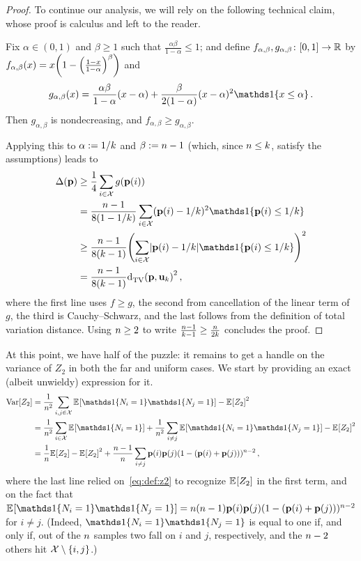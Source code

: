 \begin{proof}
To continue our analysis, we will rely on the following technical claim, whose proof is calculus and left to the reader.
\begin{claim}
Fix $\alpha\in(0,1)$ and $\beta \geq 1$ such that $\frac{\alpha\beta}{1-\alpha} \leq 1$; and define $f_{\alpha,\beta},g_{\alpha,\beta}\colon [0,1]\to\mathbb{R}$ by
$
f_{\alpha,\beta}(x) = x\Paren{1-\Paren{\frac{1-x}{1-\alpha}}^\beta}$ and 
\[
g_{\alpha,\beta}(x) = \frac{\alpha\beta}{1-\alpha}(x-\alpha) + \frac{\beta}{2(1-\alpha)} (x-\alpha)^2 \indic{x\leq \alpha}\,.
\]
Then $g_{\alpha,\beta}$ is nondecreasing, and $f_{\alpha,\beta}\geq g_{\alpha,\beta}$.
\end{claim}
Applying this to $\alpha:= 1/k$ and $\beta := n-1$ (which, since $n\leq k$, satisfy the assumptions) leads to
\begin{align*}
  \Delta(\p) 
  &%
  \geq \frac{1}{4}\sum_{i\in\domain} g(\p(i)) \\
  &= \frac{\ns-1}{8(1-1/\ab)} \sum_{i\in\domain} (\p(i)-1/\ab)^2\indic{\p(i)\leq 1/\ab} \\
  &\geq \frac{\ns-1}{8(\ab-1)} \Paren{\sum_{i\in\domain} \abs{\p(i)-1/\ab}\indic{\p(i)\leq 1/\ab}}^2 \\
  &= \frac{\ns-1}{8(\ab-1)} \totalvardist{\p}{\uniform_\ab}^2\,,
\end{align*}
where the first line uses $f\geq g$, the second from cancellation of the linear term of $g$, the third is Cauchy--Schwarz, and the last follows from the definition of total variation distance. Using $n \geq 2$ to write $\frac{n-1}{k-1}\geq \frac{n}{2k}$ concludes the proof.
\end{proof}
At this point, we have half of the puzzle: it remains to get a handle on the variance of $Z_2$ in both the far and uniform cases. We start by providing an exact (albeit unwieldy) expression for it.%
\begin{align*}
\Var[Z_2] 
&= \frac{1}{\ns^2}\sum_{i,j\in\domain} \bEE{\indic{\occur_i=1}\indic{\occur_j=1}} - \bEE{Z_2}^2  \\
&= \frac{1}{\ns^2}\sum_{i\in\domain} \bEE{\indic{\occur_i=1}} + \frac{1}{\ns^2}\sum_{i\neq j} \bEE{\indic{\occur_i=1}\indic{\occur_j=1}} - \bEE{Z_2}^2 \\
&= \frac{1}{\ns}\bEE{Z_2}- \bEE{Z_2}^2 + \frac{\ns-1}{\ns}\sum_{i\neq j} \p(i)\p(j)(1-(\p(i)+\p(j)))^{\ns-2}\,, %
\end{align*}
where the last line relied on~\cref{eq:def:z2} to recognize $\bEE{Z_2}$ in the first term, and on the fact that $\bEE{\indic{\occur_i=1}\indic{\occur_j=1}} = \ns(\ns-1)\p(i)\p(j)(1-(\p(i)+\p(j)))^{\ns-2}$ for $i\neq j$. (Indeed, $\indic{\occur_i=1}\indic{\occur_j=1}$ is equal to one if, and only if, out of the $n$ samples two fall on $i$ and $j$, respectively, and the $n-2$ others hit $\mathcal{X}\setminus\{i,j\}$.)

